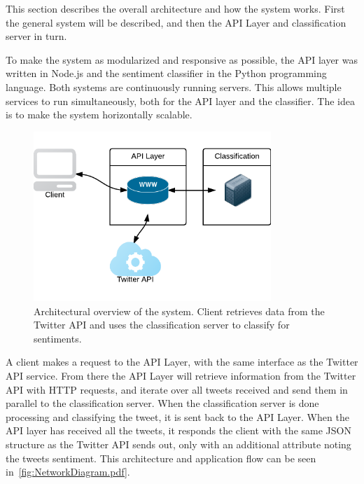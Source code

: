 This section describes the overall architecture and how the system works. First the general system will be described, and then the API Layer and classification server in turn.  

To make the system as modularized and responsive as possible, the API layer was written in Node.js and the sentiment classifier in the Python programming language. Both systems are continuously running servers. This allows multiple services to run simultaneously, both for the API layer and the classifier. The idea is to make the system horizontally scalable.

\begin{figure}[ht]
 \begin{center}
     \includegraphics[width=0.8\textwidth]{./figs/NetworkDiagram.pdf}
 \end{center}
 \caption[Architectural overview of the system.]{Architectural overview of the system. Client retrieves data from the Twitter API and uses the classification server to classify for sentiments.}
 \label{fig:NetworkDiagram.pdf}
\end{figure}

A client makes a request to the API Layer, with the same interface as the Twitter API service. From there the API Layer will retrieve information from the Twitter API with HTTP requests, and iterate over all tweets received and send them in parallel to the classification server. When the classification server is done processing and classifying the tweet, it is sent back to the API Layer. When the API layer has received all the tweets, it responds the client with the same JSON structure as the Twitter API sends out, only with an additional attribute noting the tweets sentiment. This architecture and application flow can be seen in~\autoref{fig:NetworkDiagram.pdf}. 

